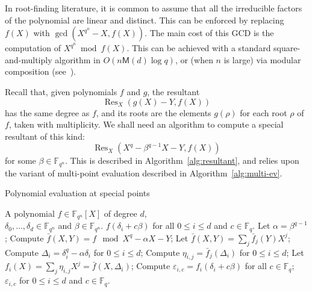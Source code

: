 \documentclass{sig-alternate}
\newcommand{\ff}[1]{\mathbb{F}_{#1}}
\newcommand{\dd}{d}
\newcommand{\qq}{q}
\newcommand{\nn}{n}
\newcommand{\qn}{{\qq^\nn}}
\newcommand{\basef}{\ff{\qq}}
\newcommand{\extf}{\ff{\qn}}
\newcommand{\bigO}{O}
\newcommand{\Mul}{\mathsf{M}}
\DeclareMathOperator{\Res}{Res}
\newcounter{algo}
\begin{document}
In root-finding literature, it is common to assume that all the irreducible factors of the polynomial are linear and distinct. This can be enforced by replacing $f(X)$ with $\gcd(X^\qn-X,f(X))$. The main cost of this GCD is the computation of $X^\qn\bmod f(X)$. This can be achieved with a standard square-and-multiply algorithm in $O(\nn\Mul(\dd)\log q)$, or (when $\nn$ is large) via modular composition (see~\cite{GathenS92,Kedlaya11}). 




Recall that, given polynomials $f$ and $g$, the resultant
$$\Res_X(g(X)-Y,f(X))$$
has the same degree as $f$, and its roots are the elements $g(\rho)$
for each root $\rho$ of $f$, taken with multiplicity. We shall need an
algorithm to compute a special resultant of this kind:
$$\Res_X(X^\qq-\beta^{\qq-1}X-Y,f(X))$$
for some $\beta\in\extf$. This is described in
Algorithm~\ref{alg:resultant}, and relies upon the variant of
multi-point evaluation described in Algorithm~\ref{alg:multi-ev}.



\begin{algorithm}
  \caption{Polynomial evaluation at special points}
  \label{alg:multi-ev}
  \begin{algorithmic}[1]
    \REQUIRE A polynomial $f\in\extf[X]$ of degree $\dd$,\\
    $\delta_0,\dots,\delta_\dd\in\extf$ and $\beta\in\extf$.
    \ENSURE $f(\delta_i+c\beta)$ for all $0\le i \le \dd$ and $c\in\basef$.
    \STATE Let $\alpha = \beta^{\qq-1}$;
    \STATE\label{alg:multi-ev:mod} Compute $\bar{f}(X,Y) = f \mod X^\qq-\alpha X-Y$;
    \STATE Let $\bar{f}(X,Y) = \sum_j \bar{f}_j(Y)X^j$;
    \STATE\label{alg:multi-ev:Delta} Compute $\Delta_i=\delta_i^\qq-\alpha\delta_i$ for $0\le i\le\dd$;
    \FOR {$0\le j<\qq$}
    \STATE\label{alg:multi-ev:multi-ev} Compute $\eta_{i,j}=\bar{f}_j(\Delta_i)$ for $0\le i\le\dd$;
    \ENDFOR
    \STATE Let $f_i(X) = \sum_j \eta_{i,j}X^j=\bar{f}(X,\Delta_i)$;
    \FOR {$0\le i \le\dd$}
    \STATE\label{alg:multi-ev:final-ev} Compute $\varepsilon_{i,c}=f_i(\delta_i+c\beta)$ for all $c\in\basef$;
    \ENDFOR
    \RETURN $\varepsilon_{i,c}$ for $0\le i\le\dd$ and $c\in\basef$.
  \end{algorithmic}
\end{algorithm}
\end{document}
